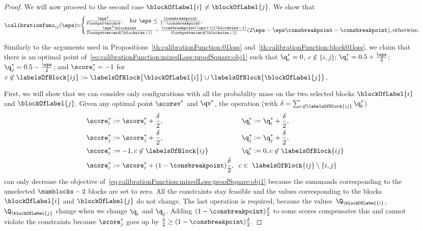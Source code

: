 \documentclass{article}
\begin{document}
\begin{proof}
    We will now proceed to the second case $\blockOfLabel{i} \neq \blockOfLabel{j}$.
    We show that
    \[
    \calibrationfunc_{ij}(\eps) \!\!=\!\! \begin{cases}
    \frac{\eps^2}{4\outputvarcard}, \quad \text{for $\eps \leq \frac{\consbreakpoint}{1-\consbreakpoint}$}, \\
    \frac{\eps^2 \blocksize}{2\outputvarcard(\blocksize+1)} - \frac{\consbreakpoint(\eps+1)(\blocksize-1)}{4\outputvarcard(\blocksize+1)}(2\eps - \eps \consbreakpoint - \consbreakpoint), \text{otherwise.} \\
    \end{cases}
    \]
    
    Similarly to the arguments used in Propositions~\ref{th:calibrationFunction:01loss} and~\ref{th:calibrationFunction:block01loss}, we claim that there is an optimal point of~\eqref{eq:calibrationFunction:mixedLoss:proofSquare:obj1} such that $\q^*_c=0$, $c \not\in \{i,j\}$; $\q^*_i = 0.5 + \frac{\eps}{2}$;  $\q^*_{j} = 0.5 - \frac{\eps}{2}$; and $\score^*_c = -1$ for $c \not\in \labelsOfBlock{ij} := \labelsOfBlock{\blockOfLabel{i}} \cup \labelsOfBlock{\blockOfLabel{j}}$.
    
    First, we will show that we can consider only configurations with all the probability mass on the two selected blocks $\blockOfLabel{i}$ and $\blockOfLabel{j}$.
    Given any optimal point $\scorev^*$ and $\qv^*$, the operation (with $\delta = \sum_{c \not\in \labelsOfBlock{ij}} \q_c^*$)
    \begin{align*}
    \score_i^* &:= \score_i^* + \frac{\delta}{2}, &
    &\q_i^* := \q_i^* + \frac{\delta}{2}, \\
    \score_j^* &:= \score_j^* + \frac{\delta}{2}, &
    &\q_{j}^* := \q_{j}^* + \frac{\delta}{2},\\
    \score_c^* &:= -1, c \not\in\labelsOfBlock{ij} &
    &\q_c^* := 0, c \not\in\labelsOfBlock{ij} \\
    \score_c^* &:= \score_c^* + (1-\consbreakpoint)\frac{\delta}{2}, \mathrlap{\;\;c \in \;\labelsOfBlock{ij} \setminus \{i,j\}}
    \end{align*}
    can only decrease the objective of~\eqref{eq:calibrationFunction:mixedLoss:proofSquare:obj1} because the summands corresponding to the unselected $\numblocks-2$ blocks are set to zero.
    All the constraints stay feasible and the values corresponding to the blocks $\blockOfLabel{i}$ and $\blockOfLabel{j}$ do not change.
    The last operation is required, because the values~$\Q_{\blockOfLabel{i}}$, $\Q_{\blockOfLabel{j}}$ change when we change $\q_i$ and $\q_j$.
    Adding $(1-\consbreakpoint)\frac{\delta}{2}$ to some scores compensates this and cannot violate the constraints because $\score_j^*$ goes up by $\frac{\delta}{2} \geq (1-\consbreakpoint)\frac{\delta}{2}$.
    

\end{proof}
\end{document}
